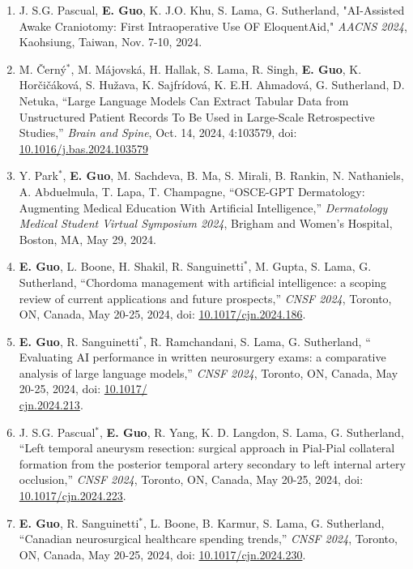\documentclass{article}
\begin{document}
\begin{enumerate}
    \item J. S.G. Pascual, \textbf{E. Guo}, K. J.O. Khu, S. Lama, G. Sutherland, "AI-Assisted Awake Craniotomy: First Intraoperative Use OF EloquentAid," \textit{AACNS 2024}, Kaohsiung, Taiwan, Nov. 7-10, 2024.
    \item M. \v{C}ern\'y$^*$, M. M\'ajovsk\'a, H. Hallak, S. Lama, R. Singh, \textbf{E. Guo}, K. Hor\v{c}i\v{c}\'akov\'a, S. Hu\v{z}ava, K. Sajfr\'idov\'a, K. E.H. Ahmadov\'a, G. Sutherland, D. Netuka, ``Large Language Models Can Extract Tabular Data from Unstructured Patient Records To Be Used in Large-Scale Retrospective Studies,'' \textit{Brain and Spine}, Oct. 14, 2024, 4:103579, doi: \href{https://doi.org/10.1016/j.bas.2024.103579}{10.1016/j.bas.2024.103579}
    \item Y. Park$^*$, \textbf{E. Guo}, M. Sachdeva, B. Ma, S. Mirali, B. Rankin, N. Nathaniels, A. Abduelmula, T. Lapa, T. Champagne, ``OSCE-GPT Dermatology: Augmenting Medical Education With Artificial Intelligence,'' \textit{Dermatology Medical Student Virtual Symposium 2024}, Brigham and Women’s Hospital, Boston, MA, May 29, 2024.
    \item \textbf{E. Guo}, L. Boone, H. Shakil, R. Sanguinetti$^*$, M. Gupta, S. Lama, G. Sutherland, ``Chordoma management with artificial intelligence: a scoping review of current applications and future prospects,'' \textit{CNSF 2024}, Toronto, ON, Canada, May 20-25, 2024, doi: \href{https://doi.org/10.1017/cjn.2024.186}{10.1017/cjn.2024.186}.
    \item \textbf{E. Guo}, R. Sanguinetti$^*$, R. Ramchandani, S. Lama, G. Sutherland, ``
    Evaluating AI performance in written neurosurgery exams: a comparative analysis of large language models,'' \textit{CNSF 2024}, Toronto, ON, Canada, May 20-25, 2024, doi: \href{https://doi.org/10.1017/cjn.2024.213}{10.1017/\\cjn.2024.213}.
    \item J. S.G. Pascual$^*$, \textbf{E. Guo}, R. Yang, K. D. Langdon, S. Lama, G. Sutherland, ``Left temporal aneurysm resection: surgical approach in Pial-Pial collateral formation from the posterior temporal artery secondary to left internal artery occlusion,'' \textit{CNSF 2024}, Toronto, ON, Canada, May 20-25, 2024, doi: \href{https://doi.org/10.1017/cjn.2024.223}{10.1017/cjn.2024.223}.
    \item \textbf{E. Guo}, R. Sanguinetti$^*$, L. Boone, B. Karmur, S. Lama, G. Sutherland, ``Canadian neurosurgical healthcare spending trends,'' \textit{CNSF 2024}, Toronto, ON, Canada, May 20-25, 2024, doi: \href{https://doi.org/10.1017/cjn.2024.230}{10.1017/cjn.2024.230}.

\end{enumerate}
\end{document}
